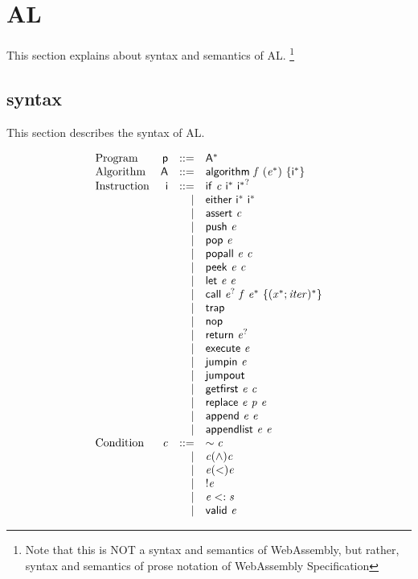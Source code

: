 \section{AL}\label{sec:al}

This section explains about syntax and semantics of AL.
\footnote{Note that this is NOT a syntax and semantics of WebAssembly, but rather,
syntax and semantics of prose notation of WebAssembly Specification}

\subsection{syntax}

This section describes the syntax of AL.

\begin{minipage}{0.5\textwidth}
$$
\begin{array}{@{}lrrl@{}}
\text{Program} & \mathsf{p} &::=& {\mathsf{A}^\ast} \\
\text{Algorithm} & \mathsf{A} &::=& \mathsf{algorithm}~\mathit{f}~({\mathit{e}^\ast})~\{{\mathsf{i}^\ast}\} \\
\text{Instruction} & \mathsf{i} &::=& \mathsf{if}~\mathit{c}~{\mathsf{i}^\ast}~{\mathsf{i}^\ast}^? \\ &&|&
\mathsf{either}~{\mathsf{i}^\ast}~{\mathsf{i}^\ast} \\ &&|&
\mathsf{assert}~\mathit{c} \\ &&|&
\mathsf{push}~\mathit{e} \\ &&|&
\mathsf{pop}~\mathit{e} \\ &&|&
\mathsf{popall}~\mathit{e}~\mathit{c} \\ &&|&
\mathsf{peek}~\mathit{e}~\mathit{c} \\ &&|&
\mathsf{let}~\mathit{e}~\mathit{e} \\ &&|&
\mathsf{call}~{\mathit{e}^?}~\mathit{f}~{\mathit{e}^\ast}~\{{({\mathit{x}^\ast} ; \mathit{iter})^\ast}\} \\ &&|&
\mathsf{trap} \\ &&|&
\mathsf{nop} \\ &&|&
\mathsf{return}~{\mathit{e}^?} \\ &&|&
\mathsf{execute}~\mathit{e} \\ &&|&
\mathsf{jumpin}~\mathit{e} \\ &&|&
\mathsf{jumpout} \\ &&|&
\mathsf{getfirst}~\mathit{e}~\mathit{c} \\ &&|&
\mathsf{replace}~\mathit{e}~\mathit{p}~\mathit{e} \\ &&|&
\mathsf{append}~\mathit{e}~\mathit{e} \\ &&|&
\mathsf{appendlist}~\mathit{e}~\mathit{e} \\
\text{Condition} & \mathit{c} &::=& \sim\mathit{c} \\ &&|&
\mathit{c}(\wedge)\mathit{c} \\ &&|&
\mathit{e}(<)\mathit{e} \\ &&|&
!\mathit{e} \\ &&|&
\mathit{e}<:\mathit{s} \\ &&|&
\mathsf{valid}~\mathit{e} \\
\end{array}
$$
\end{minipage}
